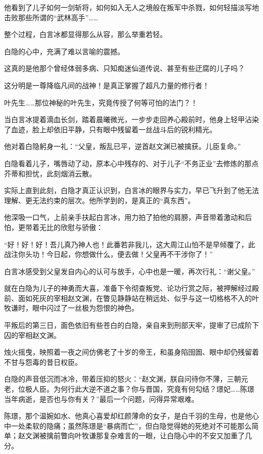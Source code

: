 他看到了儿子如何一剑斩将，如何如入无人之境般在叛军中杀戮，如何轻描淡写地击败那些所谓的“武林高手”……

整个过程，白言冰都显得那么从容，那么举重若轻。

白隐的心中，充满了难以言喻的震撼。

这真的是他那个曾经体弱多病、只知痴迷仙道传说、甚至有些迂腐的儿子吗？

这分明是一尊降临凡间的战神！是真正掌握了超凡力量的修行者！

叶先生……那位神秘的叶先生，究竟传授了何等可怕的法门？！

当白言冰提着滴血长剑，踏着晨曦微光，一步步走回养心殿前时，他身上轻甲沾染了血迹，脸上却依旧平静，只有眼中残留着一丝战斗后的锐利精光。

他对着白隐躬身一礼：“父皇，叛乱已平，逆首赵文渊已被擒获。儿臣复命。”

白隐看着儿子，嘴唇动了动，原本心中残存的、对于儿子“不务正业”去修炼的那点芥蒂和担忧，此刻烟消云散。

实际上直到此刻，白隐才真正认识到，白言冰的眼界与实力，早已飞升到了他无法理解、更无法约束的层次。他所学到的，是真正的“真东西”。

他深吸一口气，上前亲手扶起白言冰，用力拍了拍他的肩膀，声音带着激动和后怕，更带着无比的欣慰与骄傲：

“好！好！好！吾儿真乃神人也！此番若非我儿，这大周江山怕不是早倾覆了，此战注你头功！今日起，你想做什么，便去做！父皇再不干涉你了！”

白言冰感受到父皇发自内心的认可与放手，心中也是一暖，再次行礼：“谢父皇。”

就在白隐为儿子的神勇而大喜，准备下令彻查叛党、论功行赏之际，被押解经过殿前、面如死灰的宰相赵文渊，在瞥见静静站在稍远处、似乎与这一切格格不入的叶牧谦时，眼中闪过了一丝极为怨恨的神色。

\vspace{2em}

平叛后的第三日，面色依旧有些苍白的白隐，亲自来到刑部天牢，提审了已成阶下囚的宰相赵文渊。

烛火摇曳，映照着一夜之间仿佛老了十岁的帝王，和虽身陷囹圄、眼中却仍残留着不甘与怨毒的昔日权臣。

白隐的声音低沉而冰冷，带着压抑的怒火：“赵文渊，朕自问待你不薄，三朝元老，位极人臣。为何行此大逆不道之事？你与晋国，究竟有何勾结？璟妃……陈璟当年病逝，是否也与你有关？”最后一个问题，问得异常艰难。

陈璟，那个温婉如水、他真心喜爱却红颜薄命的女子，是白千羽的生母，也是他心中一处柔软的隐痛；虽然陈璟是“暴病而亡”，但白隐觉得她的死绝对不可能那么简单；赵文渊被擒前瞥向叶牧谦那复杂难言的一眼，让白隐心中的不安又加重了几分。


